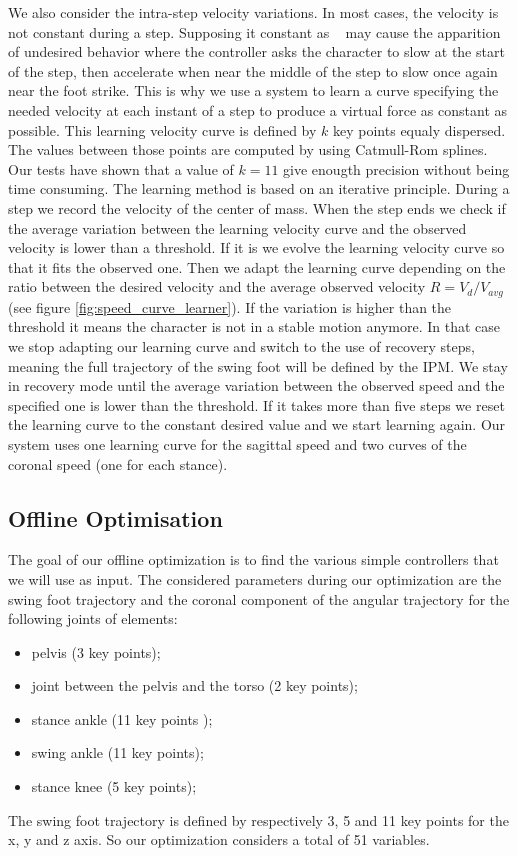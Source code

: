 \documentclass[conference]{acmsiggraph}
\begin{document}
We also consider the intra-step velocity variations. In most cases, the velocity is not constant during a step. Supposing it constant as ~\cite{coros2010generalized} may cause the apparition of undesired behavior where the controller asks the character to slow at the start of the step, then accelerate when near the middle of the step to slow once again near the foot strike. This is why we use a system to learn a curve specifying the needed velocity at each instant of a step to produce a virtual force as constant as possible. This learning velocity curve is defined by $k$ key points equaly dispersed. The values between those points are computed by using Catmull-Rom splines. Our tests have shown that a value of $k=11$ give enougth precision without being time consuming. The learning method is based on an iterative principle. During a step we record the velocity of the center of mass. When the step ends we check if the average variation between the learning velocity curve and the observed velocity is lower than a threshold. If it is we evolve the learning velocity curve so that it fits the observed one. Then we adapt the learning curve depending on the ratio between the desired velocity and the average observed velocity $R=V_d/V_{avg}$ (see figure \ref{fig:speed_curve_learner}). If the variation is higher than the threshold it means the character is not in a stable motion anymore. In that case we stop adapting our learning curve and switch to the use of recovery steps, meaning the full trajectory of the swing foot will be defined by the IPM. We stay in recovery mode until the average variation between the observed speed and the specified one is lower than the threshold. If it takes more than five steps we reset the learning curve to the constant desired value and we start learning again. Our system uses one learning curve for the sagittal speed and two curves of the coronal speed (one for each stance).

\subsection{Offline Optimisation}
\label{sec:optimisation}

The goal of our offline optimization is to find the various simple controllers that we will use as input.
The considered parameters during our optimization are the swing foot trajectory and the coronal component of the angular trajectory for the following joints of elements:
\begin{itemize}[noitemsep,nolistsep]
\item{pelvis (3 key points);}
\item{joint between the pelvis and the torso (2 key points);}
\item{stance ankle (11 key points );}
\item{swing ankle (11 key points);}
\item{stance knee (5 key points);}
\end{itemize}
The swing foot trajectory is defined by respectively 3, 5 and 11 key points for the x, y and z axis. So our optimization considers a total of 51 variables.
\end{document}
